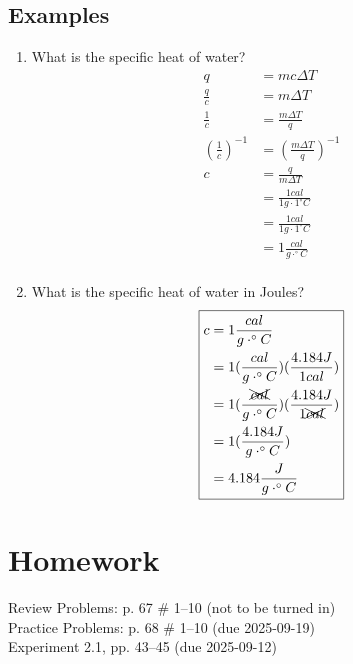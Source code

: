 \documentclass[11pt, oneside]{article}   	%
\begin{document}
\subsection{Examples}
\begin{enumerate}[label=Example \arabic*]
\item What is the specific heat of water?
\begin{equation} 
\boxed{
\begin{split}
    q &= m c \Delta T  \\
    \frac{q}{c} &= m \Delta T \\
    \frac{1}{c} &= \frac{m \Delta T}{q} \\
    (\frac{1}{c}) ^{-1} &= (\frac{m \Delta T}{q})^{-1} \\
    c &= \frac{q}{m \Delta T} \\    
       &= \frac{1 cal} {1g \cdot 1^{\circ} C} \\
       &= \frac{1 cal} {1g \cdot 1^{\circ} C} \\
       &= 1 \frac{cal} {g \cdot ^{\circ} C} \\
 \end{split}
 }
 \end{equation}
 \item What is the specific heat of water in Joules?
\begin{equation} 
\boxed{
\begin{split}
      c &= 1 \frac{cal} {g \cdot ^{\circ} C} \\
         &= 1 (\frac{cal} {g \cdot ^{\circ} C})(\frac{4.184 J}{1 cal})\\
         &= 1 (\frac{\xcancel{cal}} {g \cdot ^{\circ} C})(\frac{4.184 J}{1 \xcancel{cal}})\\
         &= 1 (\frac{4.184 J} {g \cdot ^{\circ} C})\\ 
         &= 4.184 \frac{ J} {g \cdot ^{\circ} C}\\     
 \end{split}
 }
 \end{equation}

 \end{enumerate}

\pagebreak

\section{Homework}
Review Problems: p. 67 \# 1--10 (not to be turned in)\\
Practice Problems: p. 68 \# 1--10 (due 2025-09-19)\\
Experiment 2.1, pp. 43--45 (due 2025-09-12)\\
\end{document}
